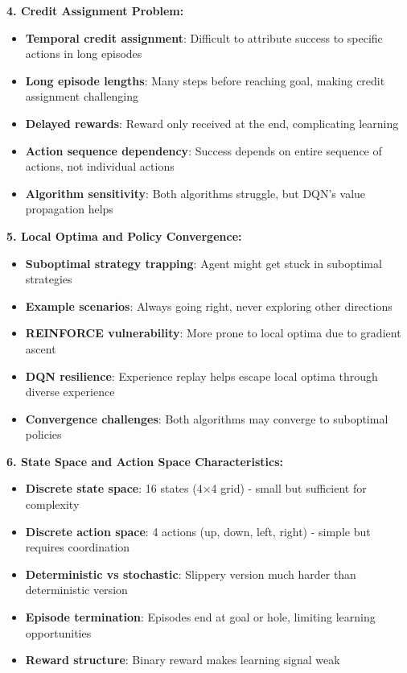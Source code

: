 \documentclass[12pt]{article}
\begin{document}
{{{\textbf{4. Credit Assignment Problem:}
\begin{itemize}
    \item \textbf{Temporal credit assignment}: Difficult to attribute success to specific actions in long episodes
    \item \textbf{Long episode lengths}: Many steps before reaching goal, making credit assignment challenging
    \item \textbf{Delayed rewards}: Reward only received at the end, complicating learning
    \item \textbf{Action sequence dependency}: Success depends on entire sequence of actions, not individual actions
    \item \textbf{Algorithm sensitivity}: Both algorithms struggle, but DQN's value propagation helps
\end{itemize}

\textbf{5. Local Optima and Policy Convergence:}
\begin{itemize}
    \item \textbf{Suboptimal strategy trapping}: Agent might get stuck in suboptimal strategies
    \item \textbf{Example scenarios}: Always going right, never exploring other directions
    \item \textbf{REINFORCE vulnerability}: More prone to local optima due to gradient ascent
    \item \textbf{DQN resilience}: Experience replay helps escape local optima through diverse experience
    \item \textbf{Convergence challenges}: Both algorithms may converge to suboptimal policies
\end{itemize}

\textbf{6. State Space and Action Space Characteristics:}
\begin{itemize}
    \item \textbf{Discrete state space}: 16 states (4×4 grid) - small but sufficient for complexity
    \item \textbf{Discrete action space}: 4 actions (up, down, left, right) - simple but requires coordination
    \item \textbf{Deterministic vs stochastic}: Slippery version much harder than deterministic version
    \item \textbf{Episode termination}: Episodes end at goal or hole, limiting learning opportunities
    \item \textbf{Reward structure}: Binary reward makes learning signal weak
\end{itemize}

}}}
\end{document}
